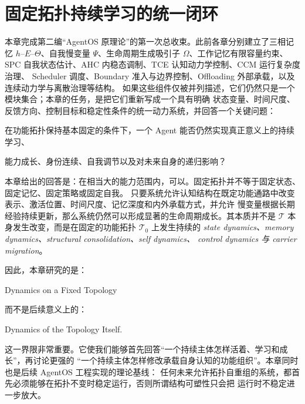 \chapter{固定拓扑持续学习的统一闭环}

\begin{chapterlead}
本章完成第二编“AgentOS 原理论”的第一次总收束。此前各章分别建立了三相记忆
$h$--$E$--$\Theta$、自我慢变量 $\Psi$、生命周期生成吸引子 $\Omega$、工作记忆有限容量约束、
SPC 自我状态估计、AHC 内稳态调制、TCE 认知动力学控制、CCM 运行复杂度治理、
Scheduler 调度、Boundary 准入与边界控制、Offloading 外部承载，以及连续动力学与离散治理等结构。
如果这些组件仅被并列描述，它们仍然只是一个模块集合；本章的任务，是把它们重新写成一个具有明确
状态变量、时间尺度、反馈方向、控制目标和稳定性条件的统一动力系统，并回答一个关键问题：

\begin{statementbox}
在功能拓扑保持基本固定的条件下，一个 Agent 能否仍然实现真正意义上的持续学习、
\end{statementbox}

\begin{statementbox}
能力成长、身份连续、自我调节以及对未来自身的递归影响？
\end{statementbox}

本章给出的回答是：在相当大的能力范围内，可以。固定拓扑并不等于固定状态、固定记忆、固定策略或固定自我。
只要系统允许认知结构在既定功能通路中改变表示、激活位置、时间尺度、记忆深度和内外承载方式，并允许
慢变量根据长期经验持续更新，那么系统仍然可以形成显著的生命周期成长。其本质并不是
$\mathcal{T}$ 本身发生改变，而是在固定的功能拓扑 $\mathcal{T}_0$ 上发生持续的
\emph{state dynamics、memory dynamics、structural consolidation、self dynamics、
control dynamics 与 carrier migration}。

因此，本章研究的是：

\begin{statementbox}
Dynamics on a Fixed Topology
\end{statementbox}

而不是后续意义上的：

\begin{statementbox}
Dynamics of the Topology Itself.
\end{statementbox}

这一界限非常重要。它使我们能够首先回答“一个持续主体怎样活着、学习和成长”，再讨论更强的
“一个持续主体怎样修改承载自身认知的功能组织”。本章同时也是后续 AgentOS 工程实现的理论基线：
任何未来允许拓扑自重组的系统，都首先必须能够在拓扑不变时稳定运行，否则所谓结构可塑性只会把
运行时不稳定进一步放大。
\end{chapterlead}

